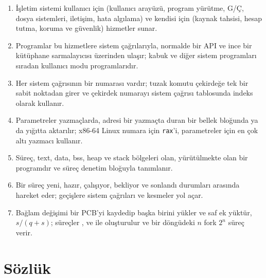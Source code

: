 \begin{keyidea}
\begin{enumerate}[leftmargin=1.4em]
  \item İşletim sistemi kullanıcı için (kullanıcı arayüzü, program yürütme, G/Ç, dosya sistemleri, iletişim, hata algılama) ve kendisi için (kaynak tahsisi, hesap tutma, koruma ve güvenlik) hizmetler sunar.
  \item Programlar bu hizmetlere sistem çağrılarıyla, normalde bir API ve ince bir kütüphane sarmalayıcısı üzerinden ulaşır; kabuk ve diğer sistem programları sıradan kullanıcı modu programlarıdır.
  \item Her sistem çağrısının bir numarası vardır; tuzak komutu çekirdeğe tek bir sabit noktadan girer ve çekirdek numarayı sistem çağrısı tablosunda indeks olarak kullanır.
  \item Parametreler yazmaçlarda, adresi bir yazmaçta duran bir bellek bloğunda ya da yığıtta aktarılır; x86-64 Linux numara için \texttt{rax}'i, parametreler için en çok altı yazmacı kullanır.
  \item Süreç, text, data, bss, heap ve stack bölgeleri olan, yürütülmekte olan bir programdır ve süreç denetim bloğuyla tanımlanır.
  \item Bir süreç yeni, hazır, çalışıyor, bekliyor ve sonlandı durumları arasında hareket eder; geçişlere sistem çağrıları ve kesmeler yol açar.
  \item Bağlam değişimi bir PCB'yi kaydedip başka birini yükler ve saf ek yüktür, $s/(q+s)$; süreçler ,  ve  ile oluşturulur ve bir döngüdeki $n$ fork $2^{n}$ süreç verir.
\end{enumerate}
\end{keyidea}

\section{Sözlük}

